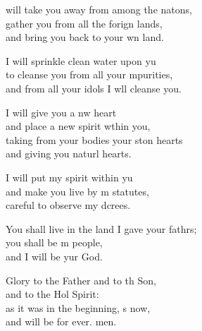 \settowidth{\versewidth}{You shall live in the land I gave your fathers; +}
\begin{psalmverse}%
  \begin{patverse}
 will take you away from among the nat\pointup{\i}ons,\Flex\\
gather you from all the forign lands,\Med\\
and bring you back to your wn land.

I will sprinkle clean water upon yu\Flex\\
to cleanse you from all your \pointup{\i}mpurities,\Med\\
and from all your idols I w\pointup{\i}ll cleanse you.

I will give you a nw heart\Med\\
and place a new spirit w\pointup{\i}thin you,\\
taking from your bodies your ston hearts\Med\\
and giving you naturl hearts.

I will put my spirit within yu\Flex\\
and make you live by m statutes,\Med\\
careful to observe my dcrees.

You shall live in the land I gave your fathrs;\Flex\\
you shall be m people,\Med\\
and I will be yur God.

Glory to the Father and to th Son,\Med\\
and to the Hol Spirit:\\
as it was in the beginning, \pointup{\i}s now,\Med\\
and will be for ever. men.
  \end{patverse}
  \end{psalmverse}
